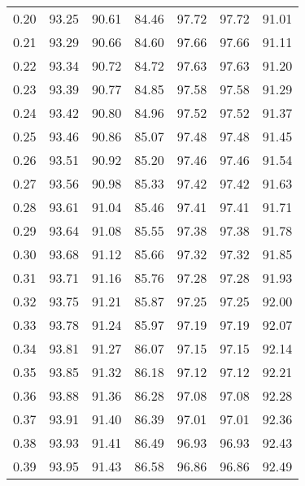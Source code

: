 \begin{tabular}{|c|c|c|c|c|c|c|}
      0.20 &     93.25 &     90.61 &      84.46 &   97.72 &      97.72 &         91.01 \\
      0.21 &     93.29 &     90.66 &      84.60 &   97.66 &      97.66 &         91.11 \\
      0.22 &     93.34 &     90.72 &      84.72 &   97.63 &      97.63 &         91.20 \\
      0.23 &     93.39 &     90.77 &      84.85 &   97.58 &      97.58 &         91.29 \\
      0.24 &     93.42 &     90.80 &      84.96 &   97.52 &      97.52 &         91.37 \\
      0.25 &     93.46 &     90.86 &      85.07 &   97.48 &      97.48 &         91.45 \\
      0.26 &     93.51 &     90.92 &      85.20 &   97.46 &      97.46 &         91.54 \\
      0.27 &     93.56 &     90.98 &      85.33 &   97.42 &      97.42 &         91.63 \\
      0.28 &     93.61 &     91.04 &      85.46 &   97.41 &      97.41 &         91.71 \\
      0.29 &     93.64 &     91.08 &      85.55 &   97.38 &      97.38 &         91.78 \\
      0.30 &     93.68 &     91.12 &      85.66 &   97.32 &      97.32 &         91.85 \\
      0.31 &     93.71 &     91.16 &      85.76 &   97.28 &      97.28 &         91.93 \\
      0.32 &     93.75 &     91.21 &      85.87 &   97.25 &      97.25 &         92.00 \\
      0.33 &     93.78 &     91.24 &      85.97 &   97.19 &      97.19 &         92.07 \\
      0.34 &     93.81 &     91.27 &      86.07 &   97.15 &      97.15 &         92.14 \\
      0.35 &     93.85 &     91.32 &      86.18 &   97.12 &      97.12 &         92.21 \\
      0.36 &     93.88 &     91.36 &      86.28 &   97.08 &      97.08 &         92.28 \\
      0.37 &     93.91 &     91.40 &      86.39 &   97.01 &      97.01 &         92.36 \\
      0.38 &     93.93 &     91.41 &      86.49 &   96.93 &      96.93 &         92.43 \\
      0.39 &     93.95 &     91.43 &      86.58 &   96.86 &      96.86 &         92.49 \\

\end{tabular}
